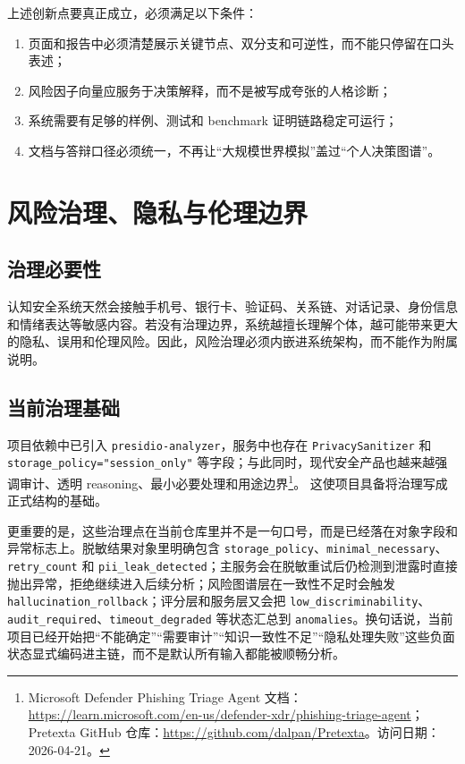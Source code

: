 \documentclass[12pt,a4paper]{ctexart}
\newcommand{\ResearchDate}{2026-04-21}
\newcommand{\SrcGovernance}{\footnote{Microsoft Defender Phishing Triage Agent 文档：\url{https://learn.microsoft.com/en-us/defender-xdr/phishing-triage-agent}；Pretexta GitHub 仓库：\url{https://github.com/dalpan/Pretexta}。访问日期：\ResearchDate。}}
\begin{document}
上述创新点要真正成立，必须满足以下条件：
\begin{enumerate}[leftmargin=2em]
  \item 页面和报告中必须清楚展示关键节点、双分支和可逆性，而不能只停留在口头表述；
  \item 风险因子向量应服务于决策解释，而不是被写成夸张的人格诊断；
  \item 系统需要有足够的样例、测试和 benchmark 证明链路稳定可运行；
  \item 文档与答辩口径必须统一，不再让“大规模世界模拟”盖过“个人决策图谱”。
\end{enumerate}

\section{风险治理、隐私与伦理边界}

\subsection{治理必要性}

认知安全系统天然会接触手机号、银行卡、验证码、关系链、对话记录、身份信息和情绪表达等敏感内容。若没有治理边界，系统越擅长理解个体，越可能带来更大的隐私、误用和伦理风险。因此，风险治理必须内嵌进系统架构，而不能作为附属说明。

\subsection{当前治理基础}

项目依赖中已引入 \texttt{presidio-analyzer}，服务中也存在 \texttt{PrivacySanitizer} 和 \texttt{storage\_policy="session\_only"} 等字段；与此同时，现代安全产品也越来越强调审计、透明 reasoning、最小必要处理和用途边界\SrcGovernance。 这使项目具备将治理写成正式结构的基础。

更重要的是，这些治理点在当前仓库里并不是一句口号，而是已经落在对象字段和异常标志上。脱敏结果对象里明确包含 \texttt{storage\_policy}、\texttt{minimal\_necessary}、\texttt{retry\_count} 和 \texttt{pii\_leak\_detected}；主服务会在脱敏重试后仍检测到泄露时直接抛出异常，拒绝继续进入后续分析；风险图谱层在一致性不足时会触发 \texttt{hallucination\_rollback}；评分层和服务层又会把 \texttt{low\_discriminability}、\texttt{audit\_required}、\texttt{timeout\_degraded} 等状态汇总到 \texttt{anomalies}。换句话说，当前项目已经开始把“不能确定”“需要审计”“知识一致性不足”“隐私处理失败”这些负面状态显式编码进主链，而不是默认所有输入都能被顺畅分析。
\end{document}
